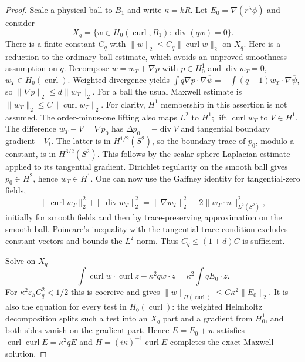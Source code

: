 \begin{proof}
Scale a physical ball to $B_1$ and write $\kappa=kR$.
Let $E_0=\nabla(r^\lambda\phi)$ and consider
\begin{equation}
 X_q=\{w\in H_0(\operatorname{curl},B_1):
                 \operatorname{div}(qw)=0\}.
 \label{hs:three-local-space}
\end{equation}
There is a finite constant $C_q$ with
$\|w\|_2\leq C_q\|\operatorname{curl}w\|_2$ on $X_q$.
Here is a reduction to the ordinary ball estimate, which avoids an
unproved smoothness assumption on $q$.  Decompose
$w=w_T+\nabla p$ with $p\in H_0^1$ and
$\operatorname{div}w_T=0$, $w_T\in H_0(\operatorname{curl})$.
Weighted divergence yields
$\int q\nabla p\cdot\nabla\overline\psi
=-\int(q-1)w_T\cdot\nabla\overline\psi$, so
$\|\nabla p\|_2\leq d\|w_T\|_2$.
For a ball the usual Maxwell estimate is
$\|w_T\|_2\leq C\|\operatorname{curl}w_T\|_2$.
For clarity, $H^1$ membership in this assertion is not assumed.
The order-minus-one lifting also maps $L^2$ to $H^1$; lift
$\operatorname{curl}w_T$ to $V\in H^1$.  The difference
$w_T-V=\nabla p_0$ has $\Delta p_0=-\operatorname{div}V$ and
tangential boundary gradient $-V_t$.  The latter is in
$H^{1/2}(S^2)$, so the boundary trace of $p_0$, modulo a constant,
is in $H^{3/2}(S^2)$.  This follows by the scalar sphere Laplacian
estimate applied to its tangential gradient.  Dirichlet regularity
on the smooth ball gives $p_0\in H^2$, hence $w_T\in H^1$.
One can now use the Gaffney identity for tangential-zero fields,
\begin{equation}
 \|\operatorname{curl}w_T\|_2^2+\|\operatorname{div}w_T\|_2^2
 =\|\nabla w_T\|_2^2+2\|w_T\cdot n\|_{L^2(S^2)}^2,
 \label{hs:three-gaffney}
\end{equation}
initially for smooth fields and then by trace-preserving approximation
on the smooth ball.  Poincare's inequality with the tangential trace
condition excludes constant vectors and bounds the $L^2$ norm.
Thus $C_q\leq(1+d)C$ is sufficient.

Solve on $X_q$
\begin{equation}
 \int\operatorname{curl}w\cdot\operatorname{curl}\overline z
       -\kappa^2q w\cdot\overline z
 =\kappa^2\int qE_0\cdot\overline z.
 \label{hs:three-local-variational}
\end{equation}
For $\kappa^2\varepsilon_h C_q^2<1/2$ this is coercive and gives
$\|w\|_{H(\operatorname{curl})}\leq C\kappa^2\|E_0\|_2$.
It is also the equation for every test in $H_0(\operatorname{curl})$:
the weighted Helmholtz decomposition splits such a test into an
$X_q$ part and a gradient from $H_0^1$, and both sides vanish on
the gradient part.  Hence $E=E_0+w$ satisfies
$\operatorname{curl}\operatorname{curl}E=\kappa^2qE$ and
$H=(i\kappa)^{-1}\operatorname{curl}E$ completes the exact Maxwell
solution.


\end{proof}
